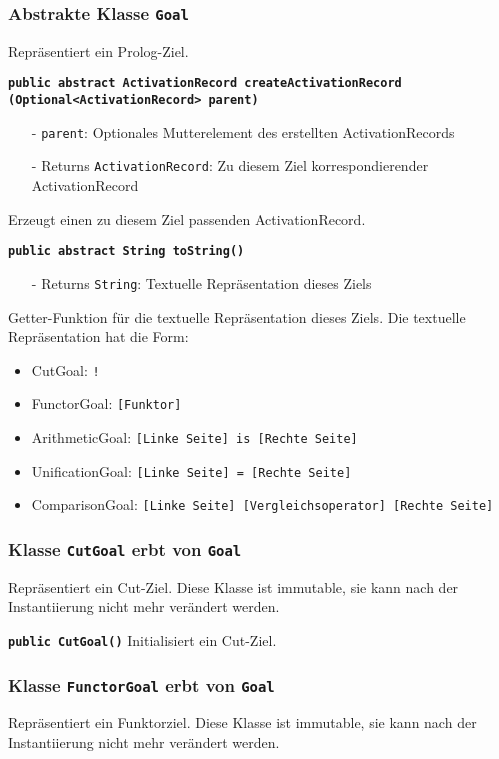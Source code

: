 \documentclass[parskip=full,11pt,twoside]{scrartcl}
\begin{document}
\subsubsection{Abstrakte Klasse \texttt{Goal}}

Repräsentiert ein Prolog-Ziel.

\textbf{\texttt{public abstract ActivationRecord createActivationRecord\\(Optional<ActivationRecord> parent)}}
\begin{itemize}[noitemsep]
	\item[-] \texttt{parent}: Optionales Mutterelement des erstellten ActivationRecords
	\item[-] Returns \texttt{ActivationRecord}: Zu diesem Ziel korrespondierender ActivationRecord
\end{itemize}
Erzeugt einen zu diesem Ziel passenden ActivationRecord.

\textbf{\texttt{public abstract String toString()}}
\begin{itemize}[noitemsep]
	\item[-] Returns \texttt{String}: Textuelle Repräsentation dieses Ziels
\end{itemize}
Getter-Funktion für die textuelle Repräsentation dieses Ziels. Die textuelle Repräsentation hat die Form:
\begin{itemize}
	\item CutGoal: \texttt{!}
	\item FunctorGoal: \texttt{[Funktor]}
	\item ArithmeticGoal: \texttt{[Linke Seite] is [Rechte Seite]}
	\item UnificationGoal: \texttt{[Linke Seite] = [Rechte Seite]}
	\item ComparisonGoal: \texttt{[Linke Seite] [Vergleichsoperator] [Rechte Seite]}
\end{itemize}

\subsubsection{Klasse \texttt{CutGoal} erbt von \texttt{Goal}}
Repräsentiert ein Cut-Ziel. Diese Klasse ist immutable, sie kann nach der Instantiierung nicht mehr verändert werden.

\textbf{\texttt{public CutGoal()}}
Initialisiert ein Cut-Ziel.

\subsubsection{Klasse \texttt{FunctorGoal} erbt von \texttt{Goal}}
Repräsentiert ein Funktorziel. Diese Klasse ist immutable, sie kann nach der Instantiierung nicht mehr verändert werden.
\end{document}
